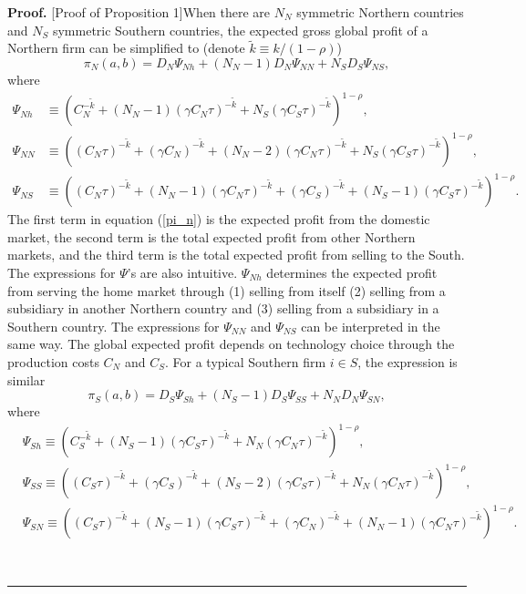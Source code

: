 \documentclass[notitlepage,11pt]{article}%
\newenvironment{proof}[1][Proof]{\noindent \textbf{#1.} }{\  \rule{0.5em}{0.5em}}
\begin{document}
\begin{proof}
[Proof of Proposition 1]When there are $N_{N}$ symmetric Northern countries
and $N_{S}$ symmetric Southern countries, the expected gross global profit of
a Northern firm can be simplified to (denote $\tilde{k}\equiv k/\left(
1-\rho\right)  $)%
\begin{equation}
\pi_{N}\left(  a,b\right)  =D_{N}\Psi_{Nh}+\left(  N_{N}-1\right)  D_{N}%
\Psi_{NN}+N_{S}D_{S}\Psi_{NS}, \label{pi_n}%
\end{equation}
where
\begin{align*}
\Psi_{Nh}  &  \equiv\left(  C_{N}^{-\tilde{k}}+\left(  N_{N}-1\right)  \left(
\gamma C_{N}\tau\right)  ^{-\tilde{k}}+N_{S}\left(  \gamma C_{S}\tau\right)
^{-\tilde{k}}\right)  ^{1-\rho},\\
\Psi_{NN}  &  \equiv\left(  \left(  C_{N}\tau\right)  ^{-\tilde{k}}+\left(
\gamma C_{N}\right)  ^{-\tilde{k}}+\left(  N_{N}-2\right)  \left(  \gamma
C_{N}\tau\right)  ^{-\tilde{k}}+N_{S}\left(  \gamma C_{S}\tau\right)
^{-\tilde{k}}\right)  ^{1-\rho},\\
\Psi_{NS}  &  \equiv\left(  \left(  C_{N}\tau\right)  ^{-\tilde{k}}+\left(
N_{N}-1\right)  \left(  \gamma C_{N}\tau\right)  ^{-\tilde{k}}+\left(  \gamma
C_{S}\right)  ^{-\tilde{k}}+\left(  N_{S}-1\right)  \left(  \gamma C_{S}%
\tau\right)  ^{-\tilde{k}}\right)  ^{1-\rho}.
\end{align*}
The first term in equation (\ref{pi_n}) is the expected profit from the
domestic market, the second term is the total expected profit from other
Northern markets, and the third term is the total expected profit from selling
to the South. The expressions for $\Psi$'s are also intuitive. $\Psi_{Nh}$
determines the expected profit from serving the home market through (1)
selling from itself (2) selling from a subsidiary in another Northern country
and (3) selling from a subsidiary in a Southern country. The expressions for
$\Psi_{NN}$ and $\Psi_{NS}$ can be interpreted in the same way. The global
expected profit depends on technology choice through the production costs
$C_{N}$ and $C_{S}$. For a typical Southern firm $i\in S$, the expression is
similar%
\begin{equation}
\pi_{S}\left(  a,b\right)  =D_{S}\Psi_{Sh}+\left(  N_{S}-1\right)  D_{S}%
\Psi_{SS}+N_{N}D_{N}\Psi_{SN}, \label{pi_s}%
\end{equation}
where%
\begin{align*}
&  \Psi_{Sh}\equiv\left(  C_{S}^{-\tilde{k}}+\left(  N_{S}-1\right)  \left(
\gamma C_{S}\tau\right)  ^{-\tilde{k}}+N_{N}\left(  \gamma C_{N}\tau\right)
^{-\tilde{k}}\right)  ^{1-\rho},\\
&  \Psi_{SS}\equiv\left(  \left(  C_{S}\tau\right)  ^{-\tilde{k}}+\left(
\gamma C_{S}\right)  ^{-\tilde{k}}+\left(  N_{S}-2\right)  \left(  \gamma
C_{S}\tau\right)  ^{-\tilde{k}}+N_{N}\left(  \gamma C_{N}\tau\right)
^{-\tilde{k}}\right)  ^{1-\rho},\\
&  \Psi_{SN}\equiv\left(  \left(  C_{S}\tau\right)  ^{-\tilde{k}}+\left(
N_{S}-1\right)  \left(  \gamma C_{S}\tau\right)  ^{-\tilde{k}}+\left(  \gamma
C_{N}\right)  ^{-\tilde{k}}+\left(  N_{N}-1\right)  \left(  \gamma C_{N}%
\tau\right)  ^{-\tilde{k}}\right)  ^{1-\rho}.
\end{align*}



\end{proof}
\end{document}
